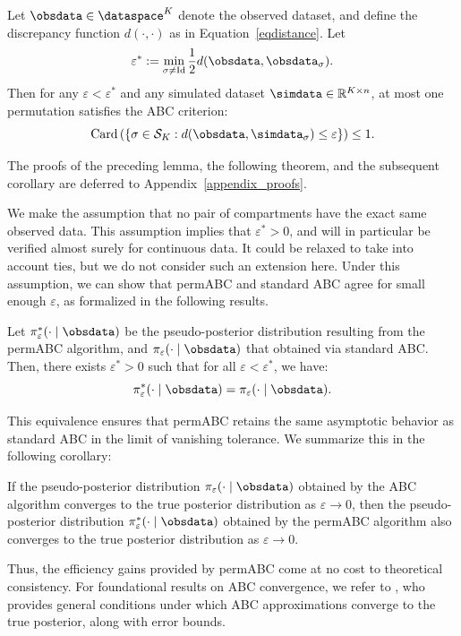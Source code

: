 \begin{lemma}
\label{lempermABC_star}
Let $\obsdata \in \dataspace^K$ denote the observed dataset, and define the discrepancy function $d(\cdot, \cdot)$ as in Equation~\eqref{eqdistance}. Let
\[
\varepsilon^* := \min_{\sigma \neq \mathrm{Id}} \frac{1}{2} d(\obsdata, \obsdata_\sigma).
\]
Then for any $\varepsilon < \varepsilon^*$ and any simulated dataset $\simdata \in \mathbb{R}^{K \times n}$, at most one permutation satisfies the ABC criterion:
\[
\mathrm{Card} \left( \left\{ \sigma \in \mathcal{S}_K : d(\obsdata, \simdata_\sigma) \leq \varepsilon \right\} \right) \leq 1.
\]
\end{lemma}

The proofs of the preceding lemma, the following theorem, and the subsequent corollary are deferred to Appendix~\ref{appendix_proofs}. 

We make the assumption that no pair of compartments have the exact same observed data. This assumption implies that $\varepsilon^*>0$, and will in particular be verified almost surely for continuous data. It could be relaxed to take into account ties, but we do not consider such an extension here. Under this assumption, we can show that permABC and standard ABC agree for small enough $\varepsilon$, as formalized in the following results.

\begin{theorem}
\label{th:permABC_star}
Let $\pi^*_{\varepsilon}( \cdot \mid \obsdata)$ be the pseudo-posterior distribution resulting from the permABC algorithm, and $\pi_{\varepsilon}( \cdot \mid \obsdata)$ that obtained via standard ABC. Then, there exists $\varepsilon^*>0$ such that for all $\varepsilon < \varepsilon^*$, we have:
\[
\pi^*_{\varepsilon}( \cdot \mid \obsdata) = \pi_{\varepsilon}( \cdot \mid \obsdata).
\]
\end{theorem}

This equivalence ensures that permABC retains the same asymptotic behavior as standard ABC in the limit of vanishing tolerance. We summarize this in the following corollary:

\begin{corollary}
\label{col:permabc}
If the pseudo-posterior distribution $\pi_{\varepsilon}(\cdot \mid \obsdata)$ obtained by the ABC algorithm converges to the true posterior distribution as $\varepsilon \to 0$, then the pseudo-posterior distribution $\pi_{\varepsilon}^*(\cdot \mid \obsdata)$ obtained by the permABC algorithm also converges to the true posterior distribution as $\varepsilon \to 0$.
\end{corollary}

Thus, the efficiency gains provided by permABC come at no cost to theoretical consistency. For foundational results on ABC convergence, we refer to \citet{fearnhead2018abc}, who provides general conditions under which ABC approximations converge to the true posterior, along with error bounds.




